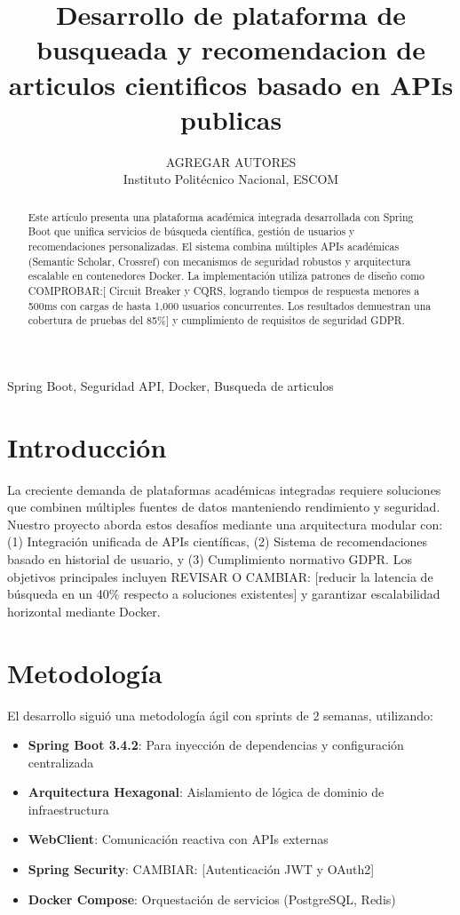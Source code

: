 \documentclass[10pt, journal]{IEEEtran}
\title{Desarrollo de plataforma de busqueada y recomendacion de articulos cientificos basado en APIs publicas}
\author{AGREGAR AUTORES\\Instituto Politécnico Nacional, ESCOM}
\begin{document}
\maketitle

\begin{abstract}
Este artículo presenta una plataforma académica integrada desarrollada con Spring Boot que unifica servicios de búsqueda científica, gestión de usuarios y recomendaciones personalizadas. El sistema combina múltiples APIs académicas (Semantic Scholar, Crossref) con mecanismos de seguridad robustos y arquitectura escalable en contenedores Docker. La implementación utiliza patrones de diseño como COMPROBAR:[ Circuit Breaker y CQRS, logrando tiempos de respuesta menores a 500ms con cargas de hasta 1,000 usuarios concurrentes. Los resultados demuestran una cobertura de pruebas del 85\%] y cumplimiento de requisitos de seguridad GDPR.
\end{abstract}

\begin{IEEEkeywords}
Spring Boot, Seguridad API, Docker, Busqueda de articulos
\end{IEEEkeywords}

\section{Introducción}
La creciente demanda de plataformas académicas integradas requiere soluciones que combinen múltiples fuentes de datos manteniendo rendimiento y seguridad. Nuestro proyecto aborda estos desafíos mediante una arquitectura modular con: (1) Integración unificada de APIs científicas, (2) Sistema de recomendaciones basado en historial de usuario, y (3) Cumplimiento normativo GDPR. Los objetivos principales incluyen REVISAR O CAMBIAR: [reducir la latencia de búsqueda en un 40\% respecto a soluciones existentes] y garantizar escalabilidad horizontal mediante Docker.

\section{Metodología}
El desarrollo siguió una metodología ágil con sprints de 2 semanas, utilizando:

\begin{itemize}
\item \textbf{Spring Boot 3.4.2}: Para inyección de dependencias y configuración centralizada
\item \textbf{Arquitectura Hexagonal}: Aislamiento de lógica de dominio de infraestructura
\item \textbf{WebClient}: Comunicación reactiva con APIs externas
\item \textbf{Spring Security}: CAMBIAR: [Autenticación JWT y OAuth2]
\item \textbf{Docker Compose}: Orquestación de servicios (PostgreSQL, Redis)
\end{itemize}
\end{document}
